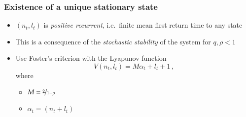 \documentclass[table,aspectratio=169]{beamer}
\begin{document}
\begin{frame}
    \frametitle{Existence of a unique stationary state}
    \begin{itemize}
        \item $(n_t, l_t)$ is \emph{positive recurrent}, i.e.\ finite
        mean first return time to any state
        \item This is a consequence of the \emph{stochastic stability} of
        the system for $q, \rho < 1$
        \item Use Foster's criterion with the Lyapunov function
        \[V(n_t, l_t) = M\alpha_t + l_t +1\,,\] where
        \begin{itemize}
            \item $M = \nicefrac{2}{1-\rho}$
            \item $\alpha_t = (n_t+l_t)$
        \end{itemize}
    \end{itemize}
\end{frame}

\end{document}
